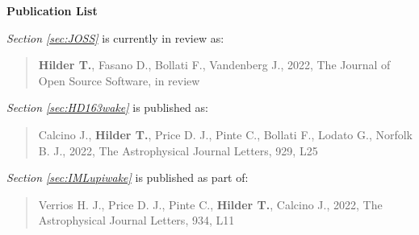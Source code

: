 \thispagestyle{plain}


\begin{center}
    
    {\Large \textbf{Publication List}}
    
\end{center}

\setlength{\parindent}{0pt}

\textit{Section \ref{sec:JOSS}} is currently in review as:

\begin{quote}
    \textbf{Hilder T.}, Fasano D., Bollati F., Vandenberg J., 2022, The Journal of Open Source Software, in review
\end{quote}

\textit{Section \ref{sec:HD163wake}} is published as:

\begin{quote}
    Calcino J., \textbf{Hilder T.}, Price D. J., Pinte C., Bollati F., Lodato G., Norfolk B. J., 2022, The Astrophysical Journal Letters, 929, L25
\end{quote}

\textit{Section \ref{sec:IMLupiwake}} is published as part of:

\begin{quote}
    Verrios H. J., Price D. J., Pinte C., \textbf{Hilder T.}, Calcino J., 2022, The Astrophysical Journal Letters, 934, L11
\end{quote}

\setlength{\parindent}{15pt}
\newpage